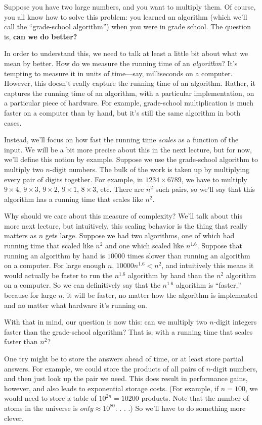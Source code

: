 \documentclass [12pt]{article}
\begin{document}
\begin{enumerate}
Suppose you have two large numbers, and you want to multiply them. Of course, you all know how to solve this problem: you learned an algorithm (which we’ll call the ``grade-school algorithm'') when you were in grade school. The question is, \textbf{can we do better?}

In order to understand this, we need to talk at least a little bit about what we mean by better. How do we measure the running time of an \textit{algorithm}? It’s tempting to measure it in units of time—say, milliseconds on a computer. However, this doesn’t really capture the running time of an algorithm. Rather, it captures the running time of an algorithm, with a particular implementation, on a particular piece of hardware. For example, grade-school multiplication is much faster on a computer than by hand, but it’s still the same algorithm in both cases.

Instead, we’ll focus on how fast the running time \textit{scales} as a function of the input. We will be a bit more precise about this in the next lecture, but for now, we’ll define this notion by example. Suppose we use the grade-school algorithm to multiply two $n$-digit numbers. The bulk of the work is taken up by multiplying every pair of digits together. For example, in
$1234 \times 6789$, we have to multiply $9 \times 4$, $9 \times 3$, $9 \times 2$, $9 \times 1$, $8 \times 3$, etc. There are $n^2$ such pairs, so we’ll say that this algorithm has a running time that scales like $n^2$.

Why should we care about this measure of complexity? We’ll talk about this more next lecture, but intuitively, this scaling behavior is the thing that really matters as $n$ gets large. Suppose we had two algorithms, one of which had running time that scaled like $n^2$ and one which scaled like $n^{1.6}$. Suppose that running an algorithm by hand is $10000$ times slower than running an algorithm on a computer. For large enough $n$, $10000n^{1.6} < n^2$, and intuitively this means it would actually be faster to run the $n^{1.6}$ algorithm by hand than the $n^2$ algorithm on a computer. So we can definitively say that the $n^{1.6}$ algorithm is ``faster,'' because for large $n$, it will be faster, no matter how the algorithm is implemented and no matter what hardware it’s running on.

With that in mind, our question is now this: can we multiply two $n$-digit integers faster than
the grade-school algorithm? That is, with a running time that scales faster than $n^2$?

One try might be to store the answers ahead of time, or at least store partial answers. For example, we could store the products of all pairs of $n$-digit numbers, and then just look up the pair we need. This does result in performance gains, however, and also leads to exponential storage costs. (For example, if $n = 100$, we would need to store a table of $10^{2n} = 10200$
products. Note that the number of atoms in the universe is $only \approx 10^{80}$. . . .) So we’ll have
to do something more clever.

\end{enumerate}
\end{document}
